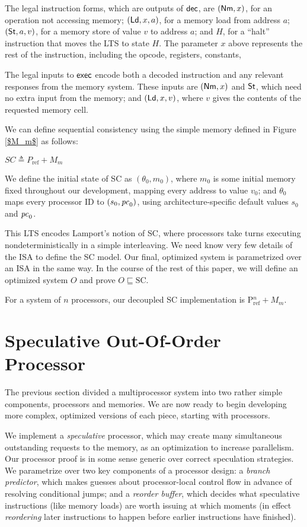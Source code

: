 The legal instruction forms, which are outputs of $\mathsf{dec}$, are $(\mathsf{Nm}, x)$, for
an operation not accessing memory; $(\mathsf{Ld}, x, a)$, for a memory load from
address $a$; $(\mathsf{St}, a, v)$, for a memory store of value $v$ to address $a$; and
$H$, for a ``halt'' instruction that moves the LTS to state $H$. The parameter
$x$ above represents the rest of the instruction, including the
opcode, registers, constants, \etc{}

The legal inputs to $\mathsf{exec}$ encode both a decoded instruction and any relevant
responses from the memory system.  These inputs are $(\mathsf{Nm}, x)$ and $\mathsf{St}$, which
need no extra input from the memory; and $(\mathsf{Ld}, x, v)$, where $v$ gives the
contents of the requested memory cell.

We can define sequential consistency using the simple memory defined in Figure
\ref{$M_m$} as follows:
\begin{defn}
$SC \triangleq P_\text{ref} + M_m$
\label{sc}
\end{defn}

We define the initial state of SC as $(\theta_0, m_0)$, where $m_0$ is
some initial memory fixed throughout our development, mapping every
address to value $v_0$; and $\theta_0$ maps every processor ID to
$(s_0, \mathit{pc}_0)$, using architecture-specific default values $s_0$ and
$\mathit{pc}_0$.

This LTS encodes Lamport's notion of SC, where processors take turns executing
nondeterministically in a simple interleaving.  We need know very few details
of the ISA to define the SC model.  Our final, optimized system is parametrized
over an ISA in the same way.  In the course of the rest of this paper, we will
define an optimized system $O$ and prove $O \sqsubseteq \text{SC}$.

For a system of $n$ processors, our decoupled SC implementation is
$\text{P$^n_{\text{ref}}$} + M_m$.

\section{Speculative Out-Of-Order Processor}\label{sec:ooo}

The previous section divided a multiprocessor system into two rather
simple components, processors and memories.  We are now ready to begin
developing more complex, optimized versions of each piece, starting
with processors.

We implement a \emph{speculative} processor, which may create many
simultaneous outstanding requests to the memory, as an optimization to
increase parallelism.  Our processor proof is in some sense generic
over correct speculation strategies.  We parametrize over two key
components of a processor design: a \emph{branch predictor}, which
makes guesses about processor-local control flow in advance of
resolving conditional jumps; and a
\emph{reorder buffer}, which decides what speculative instructions (like memory loads)
are worth issuing at which moments (in effect \emph{reordering} later
instructions to happen before earlier instructions have finished).

